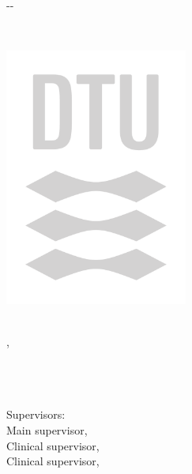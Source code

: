 \begin{titlepage}
    \begin{adjustwidth*}{}{-\marginparwidth-\marginparsep}
    \begin{center}
        \large

        \hfill

        \vfill

        \begingroup
            \color{CTtitle}\spacedallcaps{\myTitle} \\ \bigskip
        \endgroup

        \spacedlowsmallcaps{\myName}

        \vfill

        \includegraphics[width=6cm]{figures/Grey_CMYK.pdf} \\ \medskip

        \mySubtitle \\ \medskip
        \myDocument, \myTime \\
        \myDepartment \\
        \myFaculty \\
        \myUni \\ \bigskip

        Supervisors: \\
        Main supervisor, \myProf \\
        Clinical supervisor, \myOtherProf \\
        Clinical supervisor, \mySupervisor \\

        \vfill
        

    \end{center}
  \end{adjustwidth*}
\end{titlepage}
